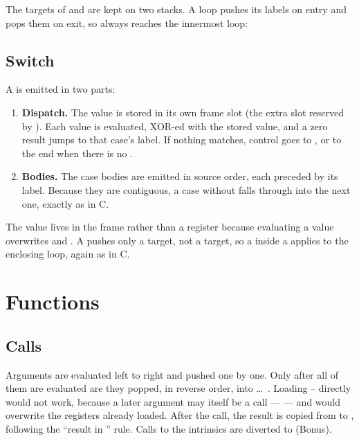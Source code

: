 \documentclass[12pt]{article}
\begin{document}
The targets of  and  are kept on two stacks. A loop pushes its labels on entry and
pops them on exit, so  always reaches the innermost loop:


\subsection{Switch}


A  is emitted in two parts:

\begin{enumerate}
  \item \textbf{Dispatch.} The value is stored in its own frame slot (the extra slot reserved by
        ). Each  value is evaluated, XOR-ed with the stored value, and a zero
        result jumps to that case's label. If nothing matches, control goes to , or to the end
        when there is no .
  \item \textbf{Bodies.} The case bodies are emitted in source order, each preceded by its label. Because they
        are contiguous, a case without  falls through into the next one, exactly as in C.
\end{enumerate}

The value lives in the frame rather than a register because evaluating a  value overwrites
 and . A  pushes only a  target, not a  target, so a
 inside a  applies to the enclosing loop, again as in C.

\section{Functions}

\subsection{Calls}


Arguments are evaluated left to right and pushed one by one. Only after all of them are evaluated are they
popped, in reverse order, into  \ldots\ . Loading -- directly would not
work, because a later argument may itself be a call ---  --- and would overwrite
the registers already loaded. After the call, the result is copied from  to , following the
``result in '' rule. Calls to the intrinsics are diverted to  (Bonus).
\end{document}
